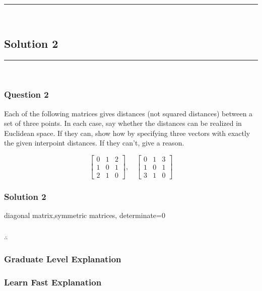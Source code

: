 \documentclass{article}
\begin{document}
\noindent\rule{\textwidth}{0.4pt}\\

\newpage

\subsection*{Solution 2}
\noindent\rule{\textwidth}{0.4pt}\\
\subsubsection*{Question 2}
\begin{flushleft}
    Each of the following matrices gives distances (not squared distances) between a set of three points. In each case, say whether the distances can be realized in Euclidean space. If they can, show how by specifying three vectors with exactly the given interpoint distances. If they can't, give a reason.

\[
\begin{bmatrix}
0 & 1 & 2 \\
1 & 0 & 1 \\
2 & 1 & 0
\end{bmatrix}, \quad
\begin{bmatrix}
0 & 1 & 3 \\
1 & 0 & 1 \\
3 & 1 & 0
\end{bmatrix}
\]
\end{flushleft}

\subsubsection*{Solution 2}
\begin{flushleft}
    diagonal matrix,symmetric matrices, determinate=0
\end{flushleft}


\subsubsection*{\normalfont}{$\therefore$ }

\subsubsection*{Graduate Level Explanation}

\subsubsection*{Learn Fast Explanation}
\end{document}
